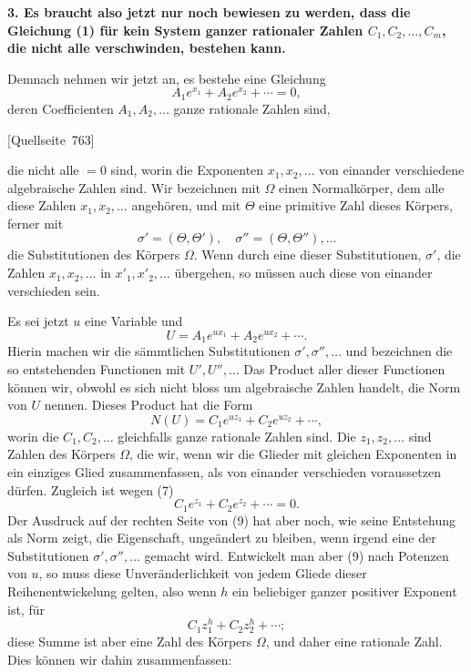 \documentclass[11pt]{article}
\newcommand{\srcpage}[1]{\par\medskip\noindent\textsf{[Quellseite~#1]}\par\smallskip}
\begin{document}
\textbf{3. Es braucht also jetzt nur noch bewiesen zu werden, dass die Gleichung (1) für kein System ganzer rationaler Zahlen $C_1,C_2,\ldots,C_m$, die nicht alle verschwinden, bestehen kann.}

Demnach nehmen wir jetzt an, es bestehe eine Gleichung
\begin{equation}\tag{7}
A_1e^{x_1}+A_2e^{x_2}+\cdots=0,
\end{equation}
deren Coefficienten $A_1,A_2,\ldots$ ganze rationale Zahlen sind,
\srcpage{763}
die nicht alle $=0$ sind, worin die Exponenten $x_1,x_2,\ldots$ von einander verschiedene algebraische Zahlen sind. Wir bezeichnen mit $\Omega$ einen Normalkörper, dem alle diese Zahlen $x_1,x_2,\ldots$ angehören, und mit $\Theta$ eine primitive Zahl dieses Körpers, ferner mit
\[
\sigma'=(\Theta,\Theta'),\quad \sigma''=(\Theta,\Theta''),\ldots
\]
die Substitutionen des Körpers $\Omega$. Wenn durch eine dieser Substitutionen, $\sigma'$, die Zahlen $x_1,x_2,\ldots$ in $x'_1,x'_2,\ldots$ übergehen, so müssen auch diese von einander verschieden sein.

Es sei jetzt $u$ eine Variable und
\begin{equation}\tag{8}
U=A_1e^{ux_1}+A_2e^{ux_2}+\cdots .
\end{equation}
Hierin machen wir die sämmtlichen Substitutionen $\sigma',\sigma'',\ldots$ und bezeichnen die so entstehenden Functionen mit $U',U'',\ldots$ Das Product aller dieser Functionen können wir, obwohl es sich nicht bloss um algebraische Zahlen handelt, die Norm von $U$ nennen. Dieses Product hat die Form
\begin{equation}\tag{9}
N(U)=C_1e^{uz_1}+C_2e^{uz_2}+\cdots,
\end{equation}
worin die $C_1,C_2,\ldots$ gleichfalls ganze rationale Zahlen sind. Die $z_1,z_2,\ldots$ sind Zahlen des Körpers $\Omega$, die wir, wenn wir die Glieder mit gleichen Exponenten in ein einziges Glied zusammenfassen, als von einander verschieden voraussetzen dürfen. Zugleich ist wegen (7)
\begin{equation}\tag{10}
C_1e^{z_1}+C_2e^{z_2}+\cdots=0.
\end{equation}
Der Ausdruck auf der rechten Seite von (9) hat aber noch, wie seine Entstehung als Norm zeigt, die Eigenschaft, ungeändert zu bleiben, wenn irgend eine der Substitutionen $\sigma',\sigma'',\ldots$ gemacht wird. Entwickelt man aber (9) nach Potenzen von $u$, so muss diese Unveränderlichkeit von jedem Gliede dieser Reihenentwickelung gelten, also wenn $h$ ein beliebiger ganzer positiver Exponent ist, für
\[
C_1z_1^h+C_2z_2^h+\cdots;
\]
diese Summe ist aber eine Zahl des Körpers $\Omega$, und daher eine rationale Zahl. Dies können wir dahin zusammenfassen:
\end{document}

